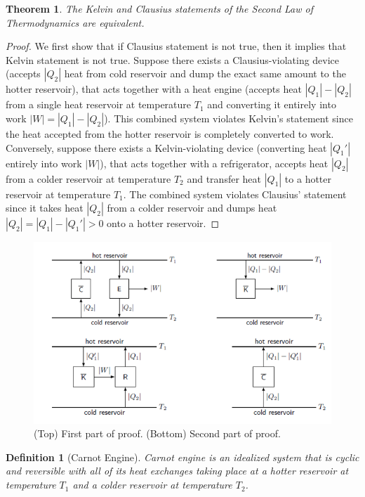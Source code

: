 \documentclass[a4paper]{article}
\newtheorem{defi}{Definition}[section]
\newtheorem{thm}{Theorem}[section]
\theoremstyle{new}
\begin{document}
\begin{thm}
The Kelvin and Clausius statements of the Second Law of Thermodynamics are equivalent.
\end{thm}
\begin{proof}
We first show that if Clausius statement is not true, then it implies that Kelvin statement is not true. Suppose there exists a Clausius-violating device (accepts $|Q_2|$ heat from cold reservoir and dump the exact same amount to the hotter reservoir), that acts together with a heat engine (accepts heat $|Q_1|-|Q_2|$ from a single heat reservoir at temperature $T_1$ and converting it entirely into work $|W|=|Q_1|-|Q_2|$). This combined system violates Kelvin's statement since the heat accepted from the hotter reservoir is completely converted to work.\\[5pt]
Conversely, suppose there exists a Kelvin-violating device (converting heat $|Q_1'|$ entirely into work $|W|$), that acts together with a refrigerator, accepts heat $|Q_2|$ from a colder reservoir at temperature $T_2$ and transfer heat $|Q_1|$ to a hotter reservoir at temperature $T_1$. The combined system violates Clausius' statement since it takes heat $|Q_2|$ from a colder reservoir and dumps heat $|Q_2|=|Q_1|-|Q_1'|>0$ onto a hotter reservoir.
\end{proof}
\begin{figure}[H]
    \centering
    \includegraphics[scale=0.8]{secondlaw2.PNG}
    \caption{(Top) First part of proof. (Bottom) Second part of proof. \cite{blundell2010concepts}}
\end{figure}
\begin{defi}[Carnot Engine]
Carnot engine is an idealized system that is cyclic and reversible with all of its heat exchanges taking place at a hotter reservoir at temperature $T_1$ and a colder reservoir at temperature $T_2$.
\end{defi}
\end{document}
